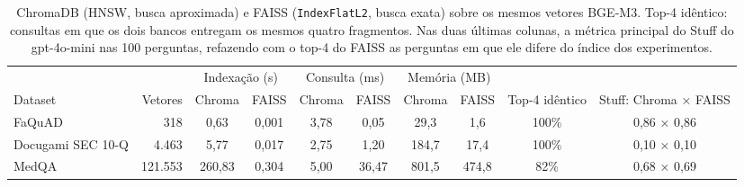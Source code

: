 \begin{table}[!t]
\centering
\footnotesize
\setlength{\tabcolsep}{4pt}
\caption{ChromaDB (HNSW, busca aproximada) e FAISS (\texttt{IndexFlatL2}, busca exata) sobre os mesmos vetores BGE-M3. Top-4 idêntico: consultas em que os dois bancos entregam os mesmos quatro fragmentos. Nas duas últimas colunas, a métrica principal do Stuff do gpt-4o-mini nas 100 perguntas, refazendo com o top-4 do FAISS as perguntas em que ele difere do índice dos experimentos.}
\label{tab:bancos}
\begin{tabular}{lrcccccccc}
\toprule
 & & \multicolumn{2}{c}{Indexação (s)} & \multicolumn{2}{c}{Consulta (ms)} & \multicolumn{2}{c}{Memória (MB)} & & \\
\cmidrule(lr){3-4}\cmidrule(lr){5-6}\cmidrule(lr){7-8}
Dataset & Vetores & Chroma & FAISS & Chroma & FAISS & Chroma & FAISS & Top-4 idêntico & Stuff: Chroma × FAISS \\
\midrule
FaQuAD & 318 & 0,63 & 0,001 & 3,78 & 0,05 & 29,3 & 1,6 & 100\% & 0,86 × 0,86 \\
Docugami SEC 10-Q & 4.463 & 5,77 & 0,017 & 2,75 & 1,20 & 184,7 & 17,4 & 100\% & 0,10 × 0,10 \\
MedQA & 121.553 & 260,83 & 0,304 & 5,00 & 36,47 & 801,5 & 474,8 & 82\% & 0,68 × 0,69 \\
\bottomrule
\end{tabular}
\end{table}
